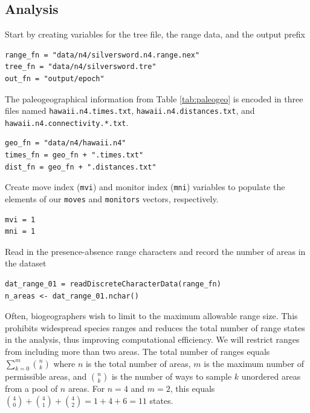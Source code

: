 \subsection*{Analysis}

Start by creating variables for the tree file, the range data, and the output prefix

\begin{snugshade}
\begin{lstlisting}
range_fn = "data/n4/silversword.n4.range.nex"
tree_fn = "data/n4/silversword.tre"
out_fn = "output/epoch"
\end{lstlisting}
\end{snugshade}

The paleogeographical information from Table \ref{tab:paleogeo} is encoded in three files named {\tt hawaii.n4.times.txt}, {\tt hawaii.n4.distances.txt}, and {\tt hawaii.n4.connectivity.*.txt}.

\begin{snugshade}
\begin{lstlisting}
geo_fn = "data/n4/hawaii.n4"
times_fn = geo_fn + ".times.txt"
dist_fn = geo_fn + ".distances.txt"
\end{lstlisting}
\end{snugshade}

Create move index ({\tt mvi}) and monitor index ({\tt mni}) variables to populate the elements of our {\tt moves} and {\tt monitors} vectors, respectively.

\begin{snugshade}
\begin{lstlisting}
mvi = 1
mni = 1
\end{lstlisting}
\end{snugshade}


Read in the presence-absence range characters and record the number of areas in the dataset

\begin{snugshade}
\begin{lstlisting}
dat_range_01 = readDiscreteCharacterData(range_fn)
n_areas <- dat_range_01.nchar()
\end{lstlisting}
\end{snugshade}

Often, biogeographers wish to limit to the maximum allowable range size.
This prohibits widespread species ranges and reduces the total number of range states in the analysis, thus improving computational efficiency.
We will restrict ranges from including more than two areas.
The total number of ranges equals $\sum_{k=0}^m {{n}\choose{k}}$ where $n$ is the total number of areas, $m$ is the maximum number of permissible areas, and ${{n}\choose{k}}$ is the number of ways to sample $k$ unordered areas from a pool of $n$ areas.
For $n=4$ and $m=2$, this equals ${{4}\choose{0}} + {{4}\choose{1}} + {{4}\choose{2}} = 1 + 4 + 6 = 11$ states.

